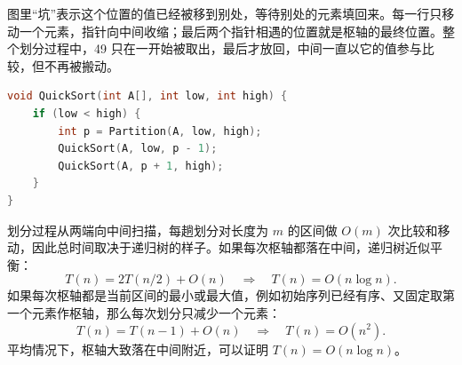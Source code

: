 图里“坑”表示这个位置的值已经被移到别处，等待别处的元素填回来。每一行只移动一个元素，指针向中间收缩；最后两个指针相遇的位置就是枢轴的最终位置。整个划分过程中，49 只在一开始被取出，最后才放回，中间一直以它的值参与比较，但不再被搬动。

\begin{lstlisting}[language=C]
void QuickSort(int A[], int low, int high) {
    if (low < high) {
        int p = Partition(A, low, high);
        QuickSort(A, low, p - 1);
        QuickSort(A, p + 1, high);
    }
}
\end{lstlisting}

划分过程从两端向中间扫描，每趟划分对长度为 $m$ 的区间做 $O(m)$ 次比较和移动，因此总时间取决于递归树的样子。如果每次枢轴都落在中间，递归树近似平衡：
\[
T(n)=2T(n/2)+O(n)\quad\Longrightarrow\quad T(n)=O(n\log n).
\]
如果每次枢轴都是当前区间的最小或最大值，例如初始序列已经有序、又固定取第一个元素作枢轴，那么每次划分只减少一个元素：
\[
T(n)=T(n-1)+O(n)\quad\Longrightarrow\quad T(n)=O(n^2).
\]
平均情况下，枢轴大致落在中间附近，可以证明 $T(n)=O(n\log n)$。

